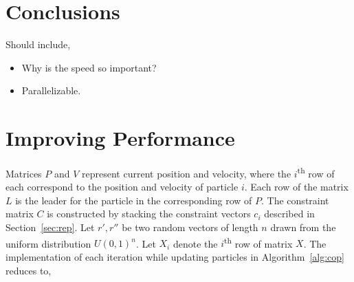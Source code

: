 \documentclass[10pt]{article}
\newenvironment{pointers}{%
  \noindent Should include,
  \begin{itemize}
    \setlength{\itemsep}{-1pt}}{%
\end{itemize}}
\begin{document}


\section{Conclusions}
\begin{pointers}
\item Why is the speed so important?
\item Parallelizable.
\end{pointers}


\appendix


\section{Improving Performance}\label{app:imp}

Matrices $P$ and $V$ represent current position and velocity, where the $i$\textsuperscript{th} row of each correspond
to the position and velocity of particle $i$. Each row of the matrix $L$ is the leader for the particle in the
corresponding row of $P$. The constraint matrix $C$ is constructed by stacking the constraint vectors $c_i$ described in
Section~\ref{sec:rep}. Let $r',r''$ be two random vectors of length $n$ drawn from the uniform distribution
${U(0,1)}^n$. Let $X_i$ denote the $i$\textsuperscript{th} row of matrix $X$. The implementation of each iteration while
updating particles in Algorithm~\ref{alg:cop} reduces to,
\end{document}
